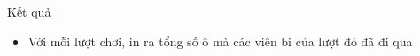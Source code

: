 Kết quả
\begin{itemize}
	\item     Với mỗi lượt chơi, in ra tổng số ô mà các viên bi của lượt đó đã đi qua   
\end{itemize}